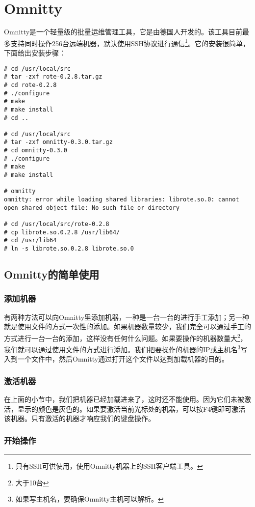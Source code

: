 \chapter{Omnitty}
\label{chap:Omnitty}

Omnitty是一个轻量级的批量运维管理工具，它是由德国人开发的。该工具目前最多支持同时操作256台远端机器，默认使用SSH协议进行通信\footnote{只有SSH可供使用，使用Omnitty机器上的SSH客户端工具。}。它的安装很简单，下面给出安装步骤：

\begin{verbatim}
# cd /usr/local/src
# tar -zxf rote-0.2.8.tar.gz
# cd rote-0.2.8
# ./configure
# make
# make install
# cd ..

# cd /usr/local/src
# tar -zxf omnitty-0.3.0.tar.gz
# cd omnitty-0.3.0
# ./configure
# make
# make install

# omnitty 
omnitty: error while loading shared libraries: librote.so.0: cannot open shared object file: No such file or directory

# cd /usr/local/src/rote-0.2.8
# cp librote.so.0.2.8 /usr/lib64/
# cd /usr/lib64
# ln -s librote.so.0.2.8 librote.so.0
\end{verbatim}

\section{Omnitty的简单使用}
\label{sec:omnittyBasicUseage}

\subsection{添加机器}
\label{subsec:addMachine}

有两种方法可以向Omnitty里添加机器，一种是一台一台的进行手工添加；另一种就是使用文件的方式一次性的添加。如果机器数量较少，我们完全可以通过手工的方式进行一台一台的添加，这样没有任何什么问题。如果要操作的机器数量大\footnote{大于10台}，我们就可以通过使用文件的方式进行添加。我们把要操作的机器的IP或主机名\footnote{如果写主机名，要确保Omnitty主机可以解析。}写入到一个文件中，然后Omnitty通过打开这个文件以达到加载机器的目的。

\subsection{激活机器}
\label{subsec:activeMachine}

在上面的小节中，我们把机器已经加载进来了，这时还不能使用。因为它们未被激活，显示的颜色是灰色的。如果要激活当前光标处的机器，可以按F4键即可激活该机器。只有激活的机器才响应我们的键盘操作。

\subsection{开始操作}
\label{subsec:beginOps}

